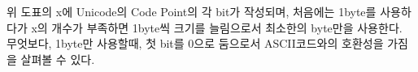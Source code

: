 \documentclass[a4paper,12pt]{book}
\begin{document}
\begin{appendices}
위 도표의 x에 Unicode의 Code Point의 각 bit가 작성되며,
처음에는 1byte를 사용하다가 x의 개수가 부족하면 1byte씩 크기를 늘림으로서 최소한의 byte만을 사용한다.
무엇보다, 1byte만 사용할때, 첫 bit를 0으로 둠으로서 ASCII코드와의 호환성을 가짐을 살펴볼 수 있다.




\end{appendices}
\end{document}
